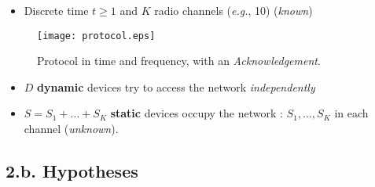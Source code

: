 \begin{frameO}[Model]

    \begin{itemize}\tightlist
        \item
              Discrete time \(t\geq1\) and \(K\) radio channels (\emph{e.g.}, 10)
              \hfill{} (\emph{known})
    \end{itemize}

    \begin{figure}[h!]
        \centering
        \texttt{[image: protocol.eps]}
        \caption{\small{Protocol in time and frequency, with an \emph{Acknowledgement}.}}
    \end{figure}

    \begin{itemize}\tightlist
        \item
              \(D\) \textbf{dynamic} devices try to access the network
              \emph{independently}
        \item
              \(S=S_1+\dots+S_{K}\) \textbf{static} devices occupy the network :
              \newline
              \(S_1,\dots,S_{K}\) in each channel \hfill{} (\emph{unknown}).
    \end{itemize}

\end{frameO}



\subsection{\hfill{}2.b. Hypotheses\hfill{}}

